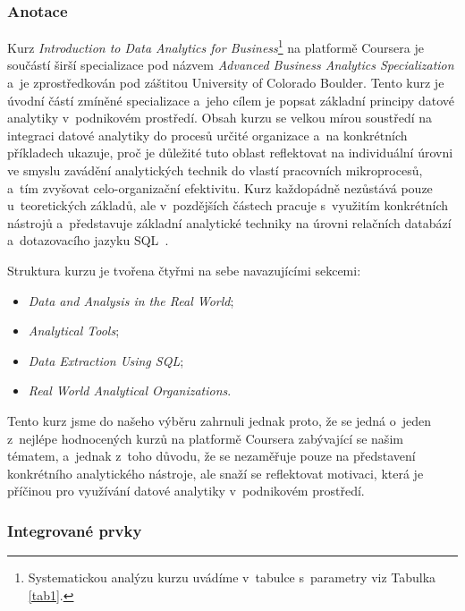 \hypertarget{anotace}{%
\subsubsection{Anotace}\label{anotace}}

Kurz \emph{Introduction to Data Analytics for Business}\footnote{Systematickou analýzu kurzu uvádíme v~tabulce s~parametry viz Tabulka \ref{tab1}.} na platformě Coursera je součástí širší specializace pod názvem \emph{Advanced Business Analytics Specialization} a~je zprostředkován pod záštitou University of Colorado Boulder. Tento kurz je úvodní částí zmíněné specializace a~jeho cílem je popsat základní principy datové analytiky v~podnikovém prostředí. Obsah kurzu se velkou mírou soustředí na integraci datové analytiky do procesů určité organizace a~na konkrétních příkladech ukazuje, proč je důležité tuto oblast reflektovat na individuální úrovni ve smyslu zavádění analytických technik do vlastí pracovních mikroprocesů, a~tím zvyšovat celo-organizační efektivitu. Kurz každopádně nezůstává pouze u~teoretických základů, ale v~pozdějších částech pracuje s~využitím konkrétních nástrojů a~představuje základní analytické techniky na úrovni relačních databází a~dotazovacího jazyku SQL~\parencite{course1}.

Struktura kurzu je tvořena čtyřmi na sebe navazujícími sekcemi:

\begin{itemize}
\tightlist
\item
  \emph{Data and Analysis in the Real World};
\item
  \emph{Analytical Tools};
\item
  \emph{Data Extraction Using SQL};
\item
  \emph{Real World Analytical Organizations}.
\end{itemize}

Tento kurz jsme do našeho výběru zahrnuli jednak proto, že se jedná o~jeden z~nejlépe hodnocených kurzů na platformě Coursera zabývající se našim tématem, a~jednak z~toho důvodu, že se nezaměřuje pouze na představení konkrétního analytického nástroje, ale snaží se reflektovat motivaci, která je příčinou pro využívání datové analytiky v~podnikovém prostředí.

\hypertarget{integrovanuxe9-prvky}{%
\subsubsection{Integrované prvky}\label{integrovanuxe9-prvky}}

